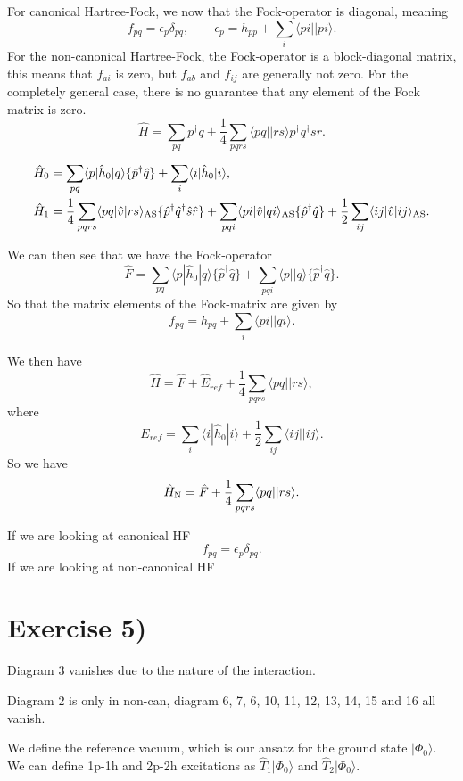 \documentclass[a4paper, 11pt, notitlepage, english]{article}
\newcommand{\ket}[1]{|#1 \rangle}
\newcommand{\brakket}[2]{\langle #1 || #2 \rangle}
\newcommand{\op}[1]{\hat{#1}}
\newcommand{\braopket}[3]{\langle #1 | {#2} | #3 \rangle}
\newcommand{\eps}{\epsilon}
\begin{document}
For canonical Hartree-Fock, we now that the Fock-operator is diagonal, meaning
$$f_{pq} = \eps_p \delta_{pq}, \qquad \eps_p = h_{pp} + \sum_{i}\brakket{pi}{pi}.$$
For the non-canonical Hartree-Fock, the Fock-operator is a block-diagonal matrix, this means that $f_{ai}$ is zero, but $f_{ab}$ and $f_{ij}$ are generally not zero.
For the completely general case, there is no guarantee that any element of the Fock matrix is zero.
$$\op{H} = \sum_{pq} p^\dagger q + \frac{1}{4}\sum_{pqrs}\brakket{pq}{rs}p^\dagger q^\dagger s r.$$

\begin{align*}
\op{H}_0 &= \sum_{pq}\braopket{p}{\op{h}_0}{q}\{\op{p}^\dag \op{q}\} + \sum_{i}\braopket{i}{\op{h}_0}{i}, \\
\op{H}_1 &= \frac{1}{4}\sum_{pqrs} \braopket{pq}{\op{v}}{rs}_{\rm AS} \{\op{p}^\dag \op{q}^\dag \op{s}\op{r}\} + \sum_{pqi} \braopket{pi}{\op{v}}{qi}_{\rm AS} \{ \op{p}^\dag \op{q} \} + \frac{1}{2}\sum_{ij} \braopket{ij}{\op{v}}{ij}_{\rm AS}.
\end{align*}

We can then see that we have the Fock-operator
$$\op{F} = \sum_{pq} \braopket{p}{\op{h}_0}{q}\{\op{p}^\dagger\op{q}\} + \sum_{pqi} \brakket{p}{q}\{\op{p}^\dagger\op{q}\}.$$
So that the matrix elements of the Fock-matrix are given by
$$f_{pq} = h_{pq} + \sum_{i}\brakket{pi}{qi}.$$

We then have
$$\op{H} = \op{F} + \op{E}_{ref} + \frac{1}{4}\sum_{pqrs}\brakket{pq}{rs},$$
where
$$E_{ref} = \sum_i \braopket{i}{\op{h}_0}{i} + \frac{1}{2}\sum_{ij}\brakket{ij}{ij}.$$
So we have
$$\op{H}_{\rm N} = \op{F} + \frac{1}{4}\sum_{pqrs}\brakket{pq}{rs}.$$

If we are looking at canonical HF
$$f_{pq} = \eps_p \delta_{pq}.$$
If we are looking at non-canonical HF




\clearpage

\section*{Exercise 5)}

Diagram 3 vanishes due to the nature of the interaction.

Diagram 2 is only in non-can, diagram 6, 7, 6, 10, 11, 12, 13, 14, 15 and 16 all vanish.


\clearpage

We define the reference vacuum, which is our ansatz for the ground state $\ket{\Phi_0}$. We can define 1p-1h and 2p-2h excitations as $\op{T}_1\ket{\Phi_0}$ and $\op{T}_2\ket{\Phi_0}$.
\end{document}
